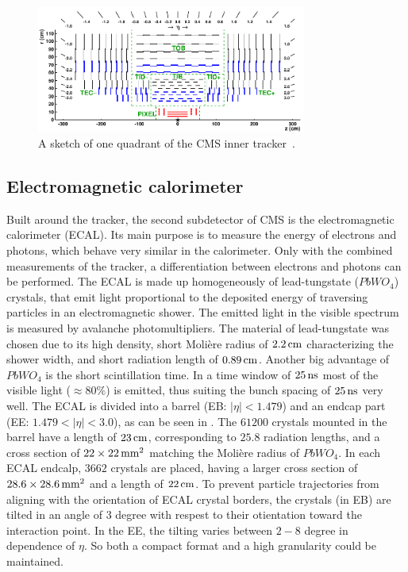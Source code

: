 \begin{figure}[tbp]
 \centering
 \includegraphics[width=0.79\textwidth]{figures/general/tracker.pdf}
 \caption{A sketch of one quadrant of the CMS inner tracker~\cite{TrackerPDFPic}.}
 \label{fig:tracker}
\end{figure}

\subsection{Electromagnetic calorimeter}
Built around the tracker, the second subdetector of CMS is the electromagnetic calorimeter (ECAL). Its main purpose is to measure the energy of electrons and photons, which behave very similar in the calorimeter. Only with the combined measurements of the tracker, a differentiation between electrons and photons can be performed. The ECAL is made up homogeneously of lead-tungstate ($PbWO_4$) crystals, that emit light proportional to the deposited energy of traversing particles in an electromagnetic shower. The emitted light in the visible spectrum is measured by avalanche photomultipliers. The material of lead-tungstate was chosen due to its high density, short Moli\`{e}re radius of $2.2\,\text{cm}$ characterizing the shower width, and short radiation length of $0.89\,\text{cm}$. Another big advantage of $PbWO_4$ is the short scintillation time. In a time window of $25\,\text{ns}$ most of the visible light ($\approx80\%$) is emitted, thus suiting the bunch spacing of $25\,\text{ns}$ very well. The ECAL is divided into a barrel (EB: $|\eta|<1.479$) and an endcap part (EE: $1.479<|\eta|<3.0$), as can be seen in . The $61200$ crystals mounted in the barrel have a length of $23\,\text{cm}$, corresponding to $25.8$ radiation lengths, and a cross section of $22\times22\,\text{mm}^2$ matching the Moli\`{e}re radius of $PbWO_4$. In each ECAL endcalp, $3662$ crystals are placed, having a larger cross section of $ 28.6\times28.6\,\text{mm}^2$ and a length of $22\,\text{cm}$.
To prevent particle trajectories from aligning with the orientation of ECAL crystal borders, the crystals (in EB) are tilted in an angle of $3$ degree with respest to their otientation toward the interaction point. In the EE, the tilting varies between $2-8$ degree in dependence of $\eta$. So both a compact format and a high granularity could be maintained.\\
